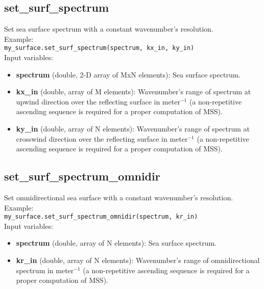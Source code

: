 \subsection{set\_surf\_spectrum}

Set sea surface spectrum with a constant wavenumber's resolution.\\

Example:\\

\texttt{my\_surface.set\_surf\_spectrum(spectrum, kx\_in, ky\_in)}\\

Input variables:
\begin{itemize}
\item {\bf spectrum} (double, 2-D array of MxN elements): Sea surface spectrum.
\item {\bf kx\_in} (double, array of M elements): Wavenumber's range of spectrum at upwind direction over the reflecting surface in meter$^{-1}$ (a non-repetitive ascending sequence is required for a proper computation of MSS).
\item {\bf ky\_in} (double, array of N elements): Wavenumber's range of spectrum at crosswind direction over the reflecting surface in meter$^{-1}$ (a non-repetitive ascending sequence is required for a proper computation of MSS).
\end{itemize}


\subsection{set\_surf\_spectrum\_omnidir}

Set omnidirectional sea surface with a constant wavenumber's resolution.\\

Example:\\

\texttt{my\_surface.set\_surf\_spectrum\_omnidir(spectrum, kr\_in)}\\

Input variables:
\begin{itemize}
\item {\bf spectrum} (double, array of N elements): Sea surface spectrum.
\item {\bf kr\_in} (double, array of N elements): Wavenumber's range of omnidirectional spectrum in meter$^{-1}$ (a non-repetitive ascending sequence is required for a proper computation of MSS).
\end{itemize}


